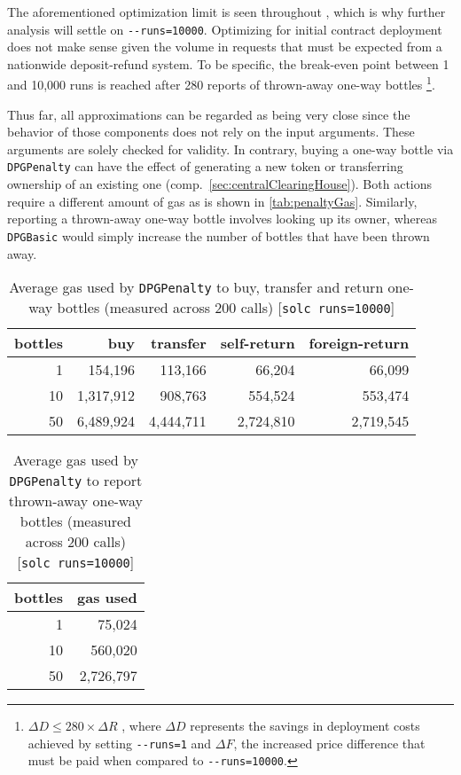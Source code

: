 \begin{appendices}
\FloatBarrier

The aforementioned optimization limit is seen throughout , which is why further analysis will settle on \texttt{-{}-runs=10000}. Optimizing for initial contract deployment does not make sense given the volume in requests that must be expected from a nationwide deposit-refund system. To be specific, the break-even point between 1 and 10,000 runs is reached after 280 reports of thrown-away one-way bottles \footnote{$ \Delta D \leq 280 \times \Delta R$ , where $\Delta D$ represents the savings in deployment costs achieved by setting \texttt{-{}-runs=1} and $\Delta F$, the increased price difference that must be paid when compared to \texttt{-{}-runs=10000}.}. 

Thus far, all approximations can be regarded as being very close since the behavior of those components does not rely on the input arguments. These arguments are solely checked for validity. In contrary, buying a one-way bottle via \texttt{DPGPenalty} can have the effect of generating a new token or transferring ownership of an existing one (comp.~\ref{sec:centralClearingHouse}). Both actions require a different amount of gas as is shown in \autoref{tab:penaltyGas}. Similarly, reporting a thrown-away one-way bottle involves looking up its owner, whereas \texttt{DPGBasic} would simply increase the number of bottles that have been thrown away.

\begin{table}[hbt]
	\centering	
	\begin{tabular}{r|r|r|r|r}
    	bottles & buy & transfer & self-return & foreign-return \\
    	\hline
    	1 & 154,196 & 113,166 & 66,204 & 66,099 \\
    	10 & 1,317,912 & 908,763 & 554,524 & 553,474 \\ 
    	50 & 6,489,924 & 4,444,711 & 2,724,810 & 2,719,545 \\
	\end{tabular}
	\caption[Average gas used to buy, transfer and return one-way bottles]{Average gas used by \texttt{DPGPenalty} to buy, transfer and return one-way bottles (measured across 200 calls) [\texttt{solc runs=10000}]}
	\label{tab:penaltyGas}
\end{table}

\begin{table}[hbt]
	\centering	
	\begin{tabular}{r|r}
    	bottles & gas used \\
    	\hline
    	1 & 75,024 \\
    	10 & 560,020 \\ 
    	50 & 2,726,797 \\
	\end{tabular}
	\caption[Average gas used to buy, transfer and return one-way bottles]{Average gas used by \texttt{DPGPenalty} to report thrown-away one-way bottles (measured across 200 calls) [\texttt{solc runs=10000}]}
	\label{tab:penaltyGas}
\end{table}


\end{appendices}
